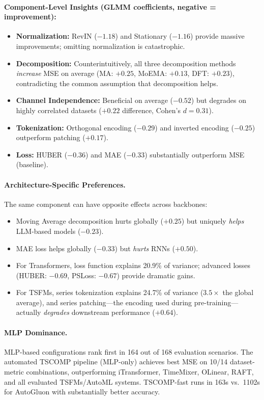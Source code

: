 \documentclass[11pt,a4paper]{article}
\begin{document}
\paragraph{Component-Level Insights (GLMM coefficients, negative = improvement):}
\begin{itemize}
\item \textbf{Normalization:} RevIN ($-1.18$) and Stationary ($-1.16$) provide massive improvements; omitting normalization is catastrophic.
\item \textbf{Decomposition:} Counterintuitively, all three decomposition methods \emph{increase} MSE on average (MA: $+0.25$, MoEMA: $+0.13$, DFT: $+0.23$), contradicting the common assumption that decomposition helps.
\item \textbf{Channel Independence:} Beneficial on average ($-0.52$) but degrades on highly correlated datasets ($+0.22$ difference, Cohen's $d = 0.31$).
\item \textbf{Tokenization:} Orthogonal encoding ($-0.29$) and inverted encoding ($-0.25$) outperform patching ($+0.17$).
\item \textbf{Loss:} HUBER ($-0.36$) and MAE ($-0.33$) substantially outperform MSE (baseline).
\end{itemize}

\paragraph{Architecture-Specific Preferences.} The same component can have opposite effects across backbones:
\begin{itemize}
\item Moving Average decomposition hurts globally ($+0.25$) but uniquely \emph{helps} LLM-based models ($-0.23$).
\item MAE loss helps globally ($-0.33$) but \emph{hurts} RNNs ($+0.50$).
\item For Transformers, loss function explains 20.9\% of variance; advanced losses (HUBER: $-0.69$, PSLoss: $-0.67$) provide dramatic gains.
\item For TSFMs, series tokenization explains 24.7\% of variance ($3.5\times$ the global average), and series patching---the encoding used during pre-training---actually \emph{degrades} downstream performance ($+0.64$).
\end{itemize}

\paragraph{MLP Dominance.} MLP-based configurations rank first in 164 out of 168 evaluation scenarios. The automated TSCOMP pipeline (MLP-only) achieves best MSE on 10/14 dataset-metric combinations, outperforming iTransformer, TimeMixer, OLinear, RAFT, and all evaluated TSFMs/AutoML systems. TSCOMP-fast runs in 163s vs.\ 1102s for AutoGluon with substantially better accuracy.
\end{document}
